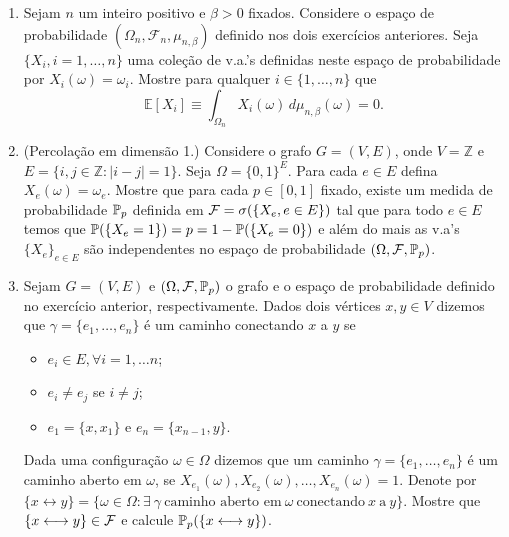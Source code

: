 \begin{enumerate}[leftmargin=*]
\item Sejam $n$ um inteiro positivo e $\beta>0$ fixados.
Considere o espaço de probabilidade 
$(\Omega_n,\mathcal{F}_n,\mu_{n,\beta})$
definido nos dois exercícios anteriores.
Seja $\{X_i,i=1,\ldots,n\}$ uma coleção 
de v.a.'s definidas neste espaço de probabilidade por 
$X_i(\omega)=\omega_i$.
Mostre para qualquer $i\in \{1,\ldots,n\}$ que
	\[
		\mathbb{E}[X_i] 
		\equiv
		\int_{\Omega_n} X_i(\omega)
		\, d\mu_{n,\beta}(\omega)
		=	 
		0.
	\]









\item (Percolação em dimensão 1.)
Considere o grafo $G=(V,E)$, 
onde $V=\mathbb{Z}$ e $E=\{ i,j\in\mathbb{Z}: |i-j|=1\}$.
Seja $\Omega=\{0,1\}^{E}$.
Para cada $e\in E$ defina $X_e(\omega)=\omega_e$.
Mostre que para cada $p\in [0,1]$ fixado, 
existe um medida de probabilidade 
$\P_p$ definida em $\F=\sigma(\{X_{e},e\in E\})$
tal que para todo $e\in E$ 
temos que $\P(\{X_e=1\})=p=1-\P(\{X_e=0\})$
e além do mais as v.a's $\{X_e\}_{e\in E}$ são independentes
no espaço de probabilidade $(\Omega,\F,\P_p)$.






\item
Sejam $G=(V,E)$ e  $(\Omega,\F,\P_p)$ o grafo e o espaço de probabilidade 
definido no exercício anterior, respectivamente.
Dados dois vértices $x,y\in V$ dizemos que 
$\gamma = \{e_1,\ldots,e_n\}$ é um caminho 
conectando $x$ a $y$ se 
\begin{itemize}
\item
$e_i\in E, \forall i=1,\ldots n$;
\item 
$e_i\neq e_j$ se $i\neq j$;
\item
$e_1=\{x,x_1\}$ e $e_n=\{x_{n-1},y\}$.
\end{itemize}
Dada uma configuração $\omega\in\Omega$
dizemos que um caminho $\gamma=\{e_1,\ldots,e_n\}$
é um caminho aberto em $\omega$, se 
$X_{e_1}(\omega),X_{e_2}(\omega),\ldots,X_{e_n}(\omega)=1$.
Denote por 
$
\{x \longleftrightarrow y\}
=
\{\omega\in\Omega: \exists\ \gamma\ \text{caminho aberto em}\ \omega\ 
\text{conectando}\ x \ \text{a}\ y\}.
$
Mostre que $\{x \longleftrightarrow y\}\in \F$ e
calcule $\P_p(\{x \longleftrightarrow y\})$.











\end{enumerate}

